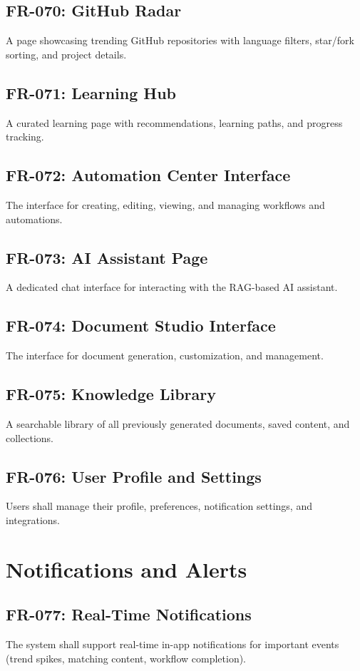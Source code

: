 \documentclass{report}
\begin{document}
\subsection{FR-070: GitHub Radar}
A page showcasing trending GitHub repositories with language filters, star/fork sorting, and project details.

\subsection{FR-071: Learning Hub}
A curated learning page with recommendations, learning paths, and progress tracking.

\subsection{FR-072: Automation Center Interface}
The interface for creating, editing, viewing, and managing workflows and automations.

\subsection{FR-073: AI Assistant Page}
A dedicated chat interface for interacting with the RAG-based AI assistant.

\subsection{FR-074: Document Studio Interface}
The interface for document generation, customization, and management.

\subsection{FR-075: Knowledge Library}
A searchable library of all previously generated documents, saved content, and collections.

\subsection{FR-076: User Profile and Settings}
Users shall manage their profile, preferences, notification settings, and integrations.

\section{Notifications and Alerts}

\subsection{FR-077: Real-Time Notifications}
The system shall support real-time in-app notifications for important events (trend spikes, matching content, workflow completion).
\end{document}
